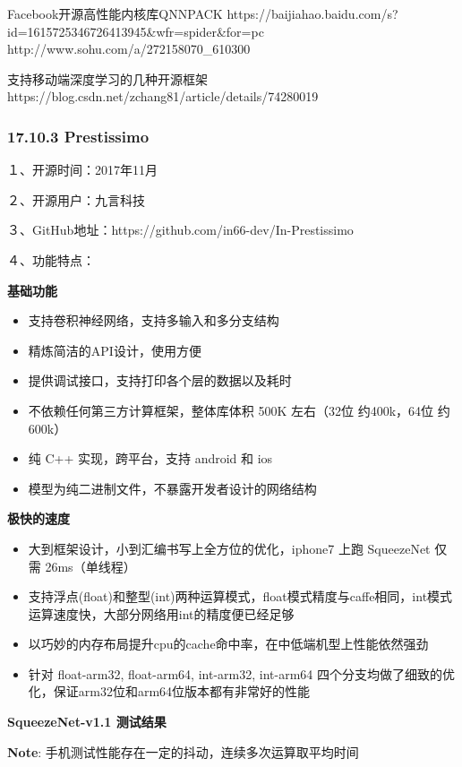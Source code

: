 Facebook开源高性能内核库QNNPACK
https://baijiahao.baidu.com/s?id=1615725346726413945\&wfr=spider\&for=pc
http://www.sohu.com/a/272158070\_610300

支持移动端深度学习的几种开源框架
https://blog.csdn.net/zchang81/article/details/74280019

\subsubsection{17.10.3 Prestissimo}\label{prestissimo}

１、开源时间：2017年11月　　　

２、开源用户：九言科技　　　　

３、GitHub地址：https://github.com/in66-dev/In-Prestissimo　　

４、功能特点：　

\textbf{基础功能}

\begin{itemize}
\item
  支持卷积神经网络，支持多输入和多分支结构
\item
  精炼简洁的API设计，使用方便
\item
  提供调试接口，支持打印各个层的数据以及耗时
\item
  不依赖任何第三方计算框架，整体库体积 500K 左右（32位 约400k，64位
  约600k）
\item
  纯 C++ 实现，跨平台，支持 android 和 ios
\item
  模型为纯二进制文件，不暴露开发者设计的网络结构
\end{itemize}

\textbf{极快的速度}

\begin{itemize}
\item
  大到框架设计，小到汇编书写上全方位的优化，iphone7 上跑 SqueezeNet 仅需
  26ms（单线程）
\item
  支持浮点(float)和整型(int)两种运算模式，float模式精度与caffe相同，int模式运算速度快，大部分网络用int的精度便已经足够
\item
  以巧妙的内存布局提升cpu的cache命中率，在中低端机型上性能依然强劲
\item
  针对 float-arm32, float-arm64, int-arm32, int-arm64
  四个分支均做了细致的优化，保证arm32位和arm64位版本都有非常好的性能
\end{itemize}

\textbf{SqueezeNet-v1.1 测试结果}

\textbf{Note}: 手机测试性能存在一定的抖动，连续多次运算取平均时间

